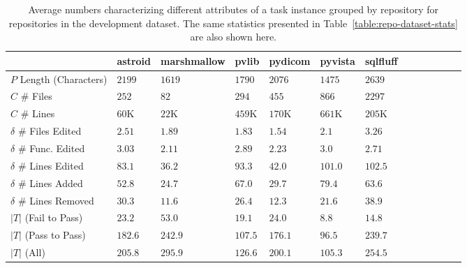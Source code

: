 \begin{table}[ht]
\centering
\begin{tabular}{l|llllllllllll}
    \toprule
        & astroid & marshmallow & pvlib & pydicom & pyvista & sqlfluff \\
    \midrule
        $P$ Length (Characters)        & $2199$ & $1619$ & $1790$ & $2076$ & $1475$ & $2639$ \\
        $C$ \# Files                   & $252$ & $82$ & $294$ & $455$ & $866$ & $2297$ \\
        $C$ \# Lines                   & $60$K & $22$K & $459$K & $170$K & $661$K & $205$K \\
        $\delta$ \# Files Edited       & $2.51$ & $1.89$ & $1.83$ & $1.54$ & $2.1$ & $3.26$ \\
        $\delta$ \# Func. Edited       & $3.03$ & $2.11$ & $2.89$ & $2.23$ & $3.0$ & $2.71$ \\
        $\delta$ \# Lines Edited       & $83.1$ & $36.2$ & $93.3$ & $42.0$ & $101.0$ & $102.5$ \\
        $\delta$ \# Lines Added        & $52.8$ & $24.7$ & $67.0$ & $29.7$ & $79.4$ & $63.6$ \\
        $\delta$ \# Lines Removed      & $30.3$ & $11.6$ & $26.4$ & $12.3$ & $21.6$ & $38.9$ \\
        $\vert T \vert$ (Fail to Pass) & $23.2$ & $53.0$ & $19.1$ & $24.0$ & $8.8$ & $14.8$ \\
        $\vert T \vert$ (Pass to Pass) & $182.6$ & $242.9$ & $107.5$ & $176.1$ & $96.5$ & $239.7$ \\
        $\vert T \vert$ (All)          & $205.8$ & $295.9$ & $126.6$ & $200.1$ & $105.3$ & $254.5$ \\
    \bottomrule
\end{tabular}
\caption{Average numbers characterizing different attributes of a \benchmark{} task instance grouped by repository for repositories in the development dataset. The same statistics presented in Table~\ref{table:repo-dataset-stats} are also shown here.}
\label{table:dev-repo-dataset-stats}
\end{table}